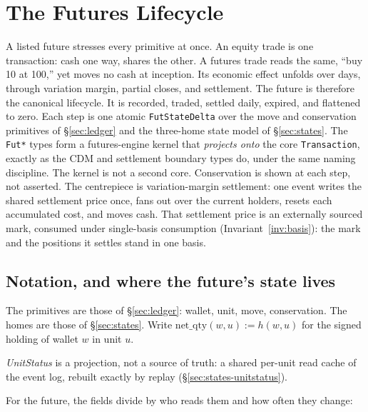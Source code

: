 \section{The Futures Lifecycle}
\label{sec:futures}

\providecommand{\code}[1]{\texttt{#1}}
\providecommand{\ac}{\texttt{ac}}
\providecommand{\netq}{\mathrm{net\_qty}}
\providecommand{\unit}{u_{F}}
\providecommand{\mult}{m}

A listed future stresses every primitive at once. An equity trade is one transaction: cash one
way, shares the other. A futures trade reads the same, ``buy 10 at 100,'' yet moves no cash at
inception. Its economic effect unfolds over days, through variation margin, partial closes, and
settlement. The future is therefore the canonical lifecycle. It is recorded, traded, settled daily,
expired, and flattened to zero. Each step is one atomic \code{FutStateDelta} over the move and
conservation primitives of \S\ref{sec:ledger} and the three-home state model of \S\ref{sec:states}.
The \code{Fut*} types form a futures-engine kernel that \emph{projects onto} the core
\code{Transaction}, exactly as the CDM and settlement boundary types do, under the same
naming discipline. The kernel is not a second core. Conservation is shown at each step, not
asserted. The centrepiece is variation-margin settlement: one event writes the shared settlement
price once, fans out over the current holders, resets each accumulated cost, and moves cash.
That settlement price is an externally sourced mark, consumed under single-basis consumption
(Invariant~\ref{inv:basis}): the mark and the positions it settles stand in one basis.

\subsection{Notation, and where the future's state lives}

The primitives are those of \S\ref{sec:ledger}: wallet, unit, move, conservation. The homes are
those of \S\ref{sec:states}. Write $\netq(w,u):=h(w,u)$ for the signed holding of wallet $w$
in unit $u$.

\emph{UnitStatus} is a projection, not a source of truth: a shared per-unit read cache of
the event log, rebuilt exactly by replay (\S\ref{sec:states-unitstatus}).

\noindent For the future, the fields divide by who reads them and how often they change:

